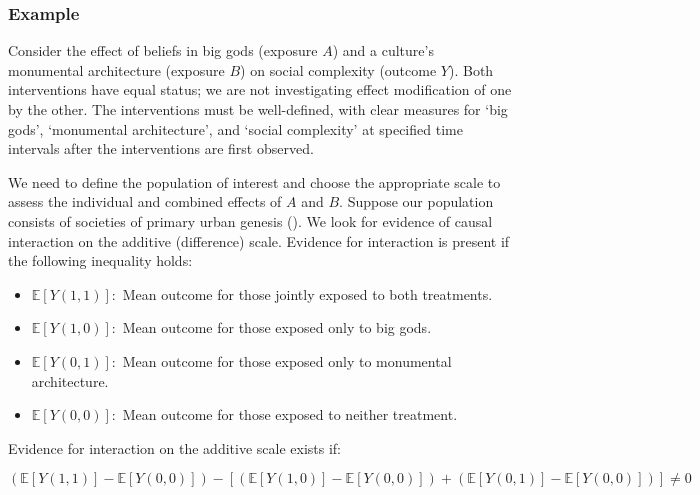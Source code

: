 \documentclass[
  single column]{article}
\providecommand{\tightlist}{%
  \setlength{\itemsep}{0pt}\setlength{\parskip}{0pt}}\usepackage{longtable,booktabs,array}
\begin{document}
\begin{table}

\caption{\label{tbl-interactionpuzzle}}

\centering{

\interactionpuzzle

}

\end{table}%

\subsubsection{Example}\label{example}

Consider the effect of beliefs in big gods (exposure \(A\)) and a
culture's monumental architecture (exposure \(B\)) on social complexity
(outcome \(Y\)). Both interventions have equal status; we are not
investigating effect modification of one by the other. The interventions
must be well-defined, with clear measures for `big gods', `monumental
architecture', and `social complexity' at specified time intervals after
the interventions are first observed.

We need to define the population of interest and choose the appropriate
scale to assess the individual and combined effects of \(A\) and \(B\).
Suppose our population consists of societies of primary urban genesis
(). We look for evidence
of causal interaction on the additive (difference) scale. Evidence for
interaction is present if the following inequality holds:

\begin{itemize}
\tightlist
\item
  \(\mathbb{E}[Y(1,1)]:\) Mean outcome for those jointly exposed to both
  treatments.
\item
  \(\mathbb{E}[Y(1,0)]:\) Mean outcome for those exposed only to big
  gods.
\item
  \(\mathbb{E}[Y(0,1)]:\) Mean outcome for those exposed only to
  monumental architecture.
\item
  \(\mathbb{E}[Y(0,0)]:\) Mean outcome for those exposed to neither
  treatment.
\end{itemize}

Evidence for interaction on the additive scale exists if:

\[
\left( \mathbb{E}[Y(1,1)] - \mathbb{E}[Y(0,0)] \right) - \left[ \left( \mathbb{E}[Y(1,0)] - \mathbb{E}[Y(0,0)] \right) + \left( \mathbb{E}[Y(0,1)] - \mathbb{E}[Y(0,0)] \right) \right] \neq 0
\]
\end{document}
